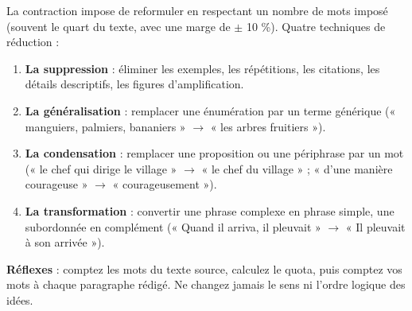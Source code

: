 \documentclass[11pt]{article}
\begin{document}
\begin{methode}
La contraction impose de reformuler en respectant un nombre de mots imposé (souvent le quart du texte, avec une marge de $\pm$ 10 \%). Quatre techniques de réduction :
\begin{enumerate}
\item \textbf{La suppression} : éliminer les exemples, les répétitions, les citations, les détails descriptifs, les figures d'amplification.
\item \textbf{La généralisation} : remplacer une énumération par un terme générique (« manguiers, palmiers, bananiers » $\rightarrow$ « les arbres fruitiers »).
\item \textbf{La condensation} : remplacer une proposition ou une périphrase par un mot (« le chef qui dirige le village » $\rightarrow$ « le chef du village » ; « d'une manière courageuse » $\rightarrow$ « courageusement »).
\item \textbf{La transformation} : convertir une phrase complexe en phrase simple, une subordonnée en complément (« Quand il arriva, il pleuvait » $\rightarrow$ « Il pleuvait à son arrivée »).
\end{enumerate}
\textbf{Réflexes} : comptez les mots du texte source, calculez le quota, puis comptez vos mots à chaque paragraphe rédigé. Ne changez jamais le sens ni l'ordre logique des idées.
\end{methode}
\end{document}
